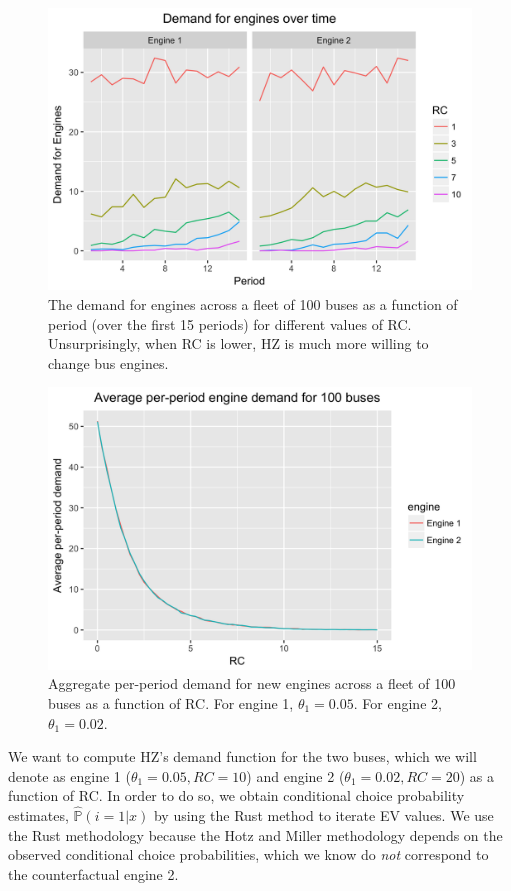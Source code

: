 \documentclass[paper=a4, fontsize=11pt]{scrartcl} %
\numberwithin{equation}{section} %
\numberwithin{figure}{section} %
\numberwithin{table}{section} %
\begin{document}
\begin{itemize}
\begin{itemize}
\begin{figure}[ht!]
\centering
	\includegraphics[scale=.25]{per_period_demand_plot.png}
\caption{The demand for engines across a fleet of 100 buses as a function of period (over the first 15 periods) for different values of RC. Unsurprisingly, when RC is lower, HZ is much more willing to change bus engines.}
\label{fig:time_demand_rc}
\end{figure}

\begin{figure}[ht!]
\centering
	\includegraphics[scale=.25]{aggregate_demand_plot.png}
\caption{Aggregate per-period demand for new engines across a fleet of 100 buses as a function of RC. For engine 1, $\theta_1 = 0.05$. For engine 2, $\theta_1 = 0.02$.}
\label{fig:agg_demand_rc}
\end{figure}


We want to compute HZ's demand function for the two buses, which we will denote as engine 1 ($\theta_1 = 0.05, RC = 10$) and engine 2 ($\theta_1 = 0.02, RC = 20$) as a function of RC. In order to do so, we obtain conditional choice probability estimates, $\hat{\mathbb{P}}(i = 1 | x)$ by using the Rust method to iterate EV values. We use the Rust methodology because the Hotz and Miller methodology depends on the observed conditional choice probabilities, which we know do \textit{not} correspond to the counterfactual engine 2.


\end{itemize}
\end{itemize}
\end{document}
